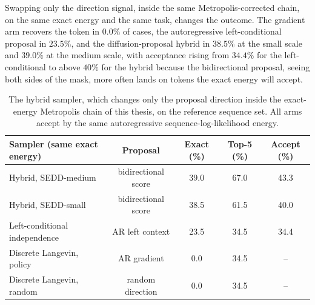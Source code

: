 Swapping only the direction signal, inside the same Metropolis-corrected chain, on the same exact energy and the same task, changes the outcome. The gradient arm recovers the token in $0.0\%$ of cases, the autoregressive left-conditional proposal in $23.5\%$, and the diffusion-proposal hybrid in $38.5\%$ at the small scale and $39.0\%$ at the medium scale, with acceptance rising from $34.4\%$ for the left-conditional to above $40\%$ for the hybrid because the bidirectional proposal, seeing both sides of the mask, more often lands on tokens the exact energy will accept. %

\begin{table}[h]
    \centering
    \small
    \setlength{\tabcolsep}{4pt}
    \begin{tabular}{lcccc}
        \toprule
        Sampler (same exact energy) & Proposal & Exact (\%) & Top-5 (\%) & Accept (\%) \\
        \midrule
        Hybrid, SEDD-medium & bidirectional score & 39.0 & 67.0 & 43.3 \\
        Hybrid, SEDD-small & bidirectional score & 38.5 & 61.5 & 40.0 \\
        Left-conditional independence & AR left context & 23.5 & 34.5 & 34.4 \\
        Discrete Langevin, policy & AR gradient & 0.0 & 34.5 & -- \\
        Discrete Langevin, random & random direction & 0.0 & 34.5 & -- \\
        \bottomrule
    \end{tabular}
    \caption[The hybrid sampler: same exact energy, different proposal.]{The hybrid sampler, which changes only the proposal direction inside the exact-energy Metropolis chain of this thesis, on the reference sequence set. All arms accept by the same autoregressive sequence-log-likelihood energy.}
    \label{tab:diffusion-hybrid}
\end{table}

